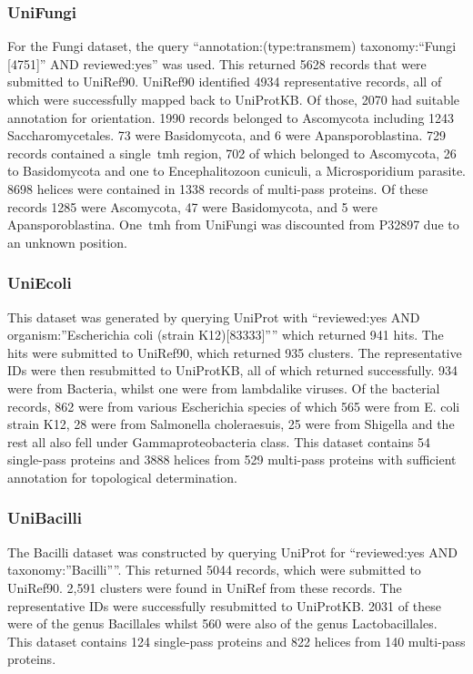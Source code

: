 \subsubsection{UniFungi}
For the Fungi dataset, the query ``annotation:(type:transmem) taxonomy:``Fungi [4751]'' AND reviewed:yes'' was used.
This returned 5628 records that were submitted to UniRef90.
UniRef90 identified 4934 representative records, all of which were successfully mapped back to UniProtKB.
Of those, 2070 had suitable annotation for orientation.
1990 records belonged to Ascomycota including 1243 Saccharomycetales.
73 were Basidomycota, and 6 were Apansporoblastina.
729 records contained a single~\gls{tmh} region, 702 of which belonged to Ascomycota, 26 to Basidomycota and one to Encephalitozoon cuniculi, a Microsporidium parasite.
8698 helices were contained in 1338 records of multi\--pass proteins.
Of these records 1285 were Ascomycota, 47 were Basidomycota, and 5 were Apansporoblastina.
One~\gls{tmh} from UniFungi was discounted from P32897 due to an unknown position.

\subsubsection{UniEcoli}
This dataset was generated by querying UniProt with ``reviewed:yes AND organism:''Escherichia coli (strain K12)[83333]'''' which returned 941 hits.
The hits were submitted to UniRef90, which returned 935 clusters.
The representative IDs were then resubmitted to UniProtKB, all of which returned successfully.
934 were from Bacteria, whilst one were from lambdalike viruses.
Of the bacterial records, 862 were from various Escherichia species of which 565 were from E.
coli strain K12, 28 were from Salmonella choleraesuis, 25 were from Shigella and the rest all also fell under Gammaproteobacteria class.
This dataset contains 54 single\--pass proteins and 3888 helices from 529 multi\--pass proteins with sufficient annotation for topological determination.

\subsubsection{UniBacilli}
The Bacilli dataset was constructed by querying UniProt for ``reviewed:yes AND taxonomy:''Bacilli''''.
This returned 5044 records, which were submitted to UniRef90.
2,591 clusters were found in UniRef from these records.
The representative IDs were successfully resubmitted to UniProtKB.
2031 of these were of the genus Bacillales whilst 560 were also of the genus Lactobacillales.
This dataset contains 124 single\--pass proteins and 822 helices from 140 multi\--pass proteins.

